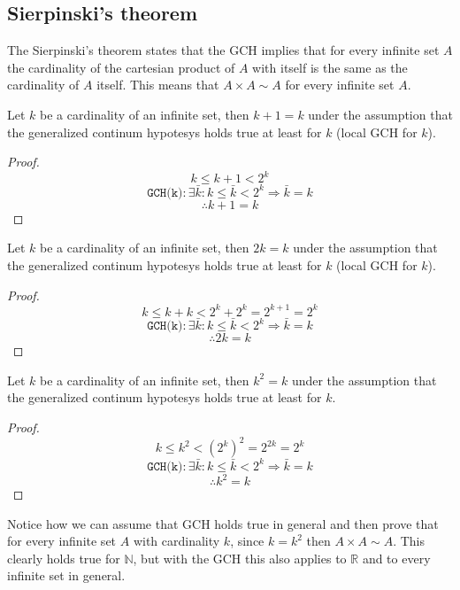 \subsection{Sierpinski's theorem}
The Sierpinski's theorem states that the GCH implies that for every infinite set $A$ the cardinality of the cartesian product of $A$ 
with itself is the same as the cardinality of $A$ itself. This means that $A \times A \sim A$ for every infinite set $A$.

\begin{lemma}
    Let $k$ be a cardinality of an infinite set, then $k + 1 = k$ under the assumption that the generalized continum 
    hypotesys holds true at least for $k$ (local GCH for $k$).
\end{lemma}
\begin{proof}
    $$ k \leq k + 1 < 2^k                                                  $$
    $$ \texttt{GCH(k)}: \exists \bar{k} : k \leq \bar{k} < 2^k \Rightarrow \bar{k} = k $$
    $$ \therefore k + 1 = k                                                $$
\end{proof}

\begin{lemma}
    Let $k$ be a cardinality of an infinite set, then $2k = k$ under the assumption that the generalized continum 
    hypotesys holds true at least for $k$ (local GCH for $k$).
\end{lemma}
\begin{proof}
    $$ k \leq k + k < 2^k + 2^k = 2^{k+1} = 2^k                                        $$
    $$ \texttt{GCH(k)}: \exists \bar{k} : k \leq \bar{k} < 2^k \Rightarrow \bar{k} = k $$
    $$ \therefore 2k = k                                                               $$
\end{proof}

\begin{theorem}
    Let $k$ be a cardinality of an infinite set, then $k^2 = k$ under the assumption that the generalized continum 
    hypotesys holds true at least for $k$.
\end{theorem}
\begin{proof}
    $$ k \leq k^2 < (2^k)^2 = 2^{2k} = 2^k                                             $$
    $$ \texttt{GCH(k)}: \exists \bar{k} : k \leq \bar{k} < 2^k \Rightarrow \bar{k} = k $$
    $$ \therefore k^2 = k                                                              $$
\end{proof}

Notice how we can assume that GCH holds true in general and then prove that for every infinite set $A$ with cardinality 
$k$, since $k = k^2$ then $A \times A \sim A$. This clearly holds true for $\mathbb{N}$, but 
with the GCH this also applies to $\mathbb{R}$ and to every infinite set in general. \newpage